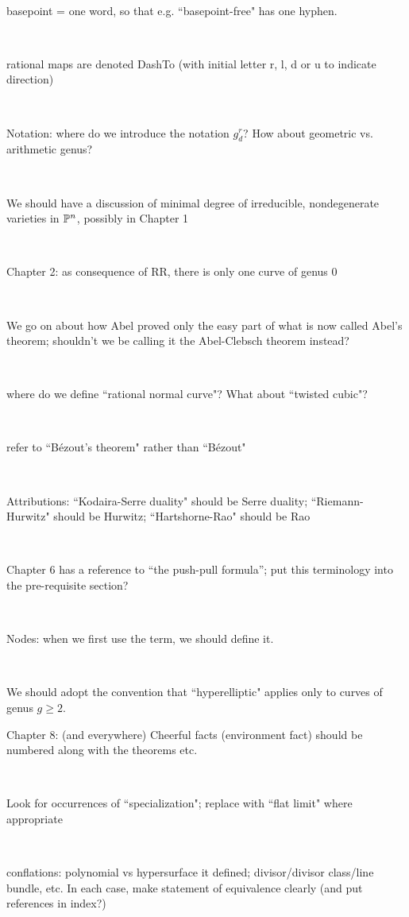 \documentclass[12pt, leqno]{book}
\begin{document}
\

basepoint = one word, so that e.g. ``basepoint-free" has one hyphen.

\

rational maps are denoted DashTo (with initial letter r, l, d or u to indicate direction)

\

Notation: where do we introduce the notation $g^r_d$? How about geometric vs. arithmetic genus?

\

We should have a discussion of minimal degree of irreducible, nondegenerate varieties in $\PP^n$, possibly in Chapter 1

\

Chapter 2: as consequence of RR, there is only one curve of genus 0

\

We go on about how Abel proved only the easy part of what is now called Abel's theorem; shouldn't we be calling it the Abel-Clebsch theorem instead?

\

where do we define ``rational normal curve"? What about ``twisted cubic"?

\

refer to ``B\' ezout's theorem" rather than ``B\' ezout"

\

Attributions: ``Kodaira-Serre duality" should be Serre duality; ``Riemann-Hurwitz" should be Hurwitz; ``Hartshorne-Rao" should be Rao

\ 

Chapter 6 has a reference to ``the push-pull formula''; put this terminology into the pre-requisite section?

\

Nodes: when we first use the term, we should define it.

\

We should adopt the convention that ``hyperelliptic" applies only to curves of genus $g \geq 2$.


Chapter 8: (and everywhere) Cheerful facts (environment fact) should be numbered along with the theorems etc.

\

Look for occurrences of ``specialization"; replace with ``flat limit" where appropriate

\

conflations: polynomial vs hypersurface it defined; divisor/divisor class/line bundle, etc. In each case, make statement of equivalence clearly (and put references in index?)
\end{document}
